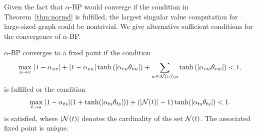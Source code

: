 Given the fact that $\alpha$-BP would converge if the condition in Theorem~\ref{thm:normd} is fulfilled, the largest singular value computation for large-sized graph could be nontrivial. We give alternative sufficient conditions for the convergence of $\alpha$-BP.

\begin{corollary}\label{chpt3:cor:converge}
  $\alpha$-BP converges to a fixed point if the condition
  \begin{align}\label{chpt3:cor:choose-col}
    \underset{u \rightarrow v}{\max}\;  | 1-\alpha_{uv} | + | 1-\alpha_{vu} |\tanh{(| \alpha_{vu} \theta_{vu} |)} + \sum_{w \in \mathcal{N}(v) \backslash u} \tanh{(| \alpha_{{vw}} \theta_{vw} |)} < 1,
  \end{align}
  is fulfilled or the condition
  \begin{align}\label{chpt3:cor:choose-row}
    \underset{t \rightarrow s}{\max}\; | 1-\alpha_{ts} | (1 + \tanh(| \alpha_{ts} \theta_{ts} |)) + (| \mathcal{N}(t) |-1)\tanh(| \alpha_{ts} \theta_{ts} |) < 1.
  \end{align}
  is satisfied, where $| \mathcal{N}(t) |$ denotes the cardinality of the set $\mathcal{N}(t)$. The associated fixed point is unique.
\end{corollary}


